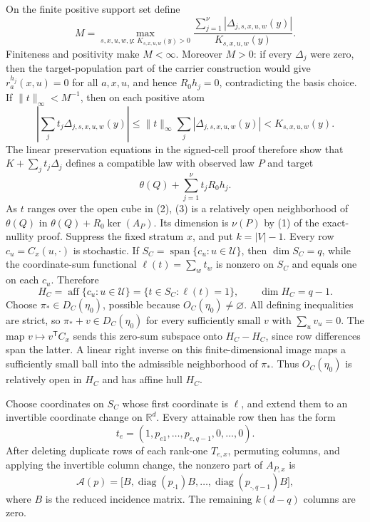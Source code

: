 On the finite positive support set define
\[
M=\max_{s,x,u,w,y:\,K_{s,x,u,w}(y)>0}
\frac{\sum_{j=1}^{\nu}|\Delta_{j,s,x,u,w}(y)|}{K_{s,x,u,w}(y)}.
\tag{1}
\]
Finiteness and positivity make \(M<\infty\).  Moreover \(M>0\): if every \(\Delta_j\) were zero, then the target-population part of the carrier construction would give \(r^{h_j}_a(x,u)=0\) for all \(a,x,u\), and hence \(R_0h_j=0\), contradicting the basis choice.  If \(\lVert t\rVert_\infty<M^{-1}\), then on each positive atom
\[
\left|\sum_jt_j\Delta_{j,s,x,u,w}(y)\right|
\le\lVert t\rVert_\infty\sum_j|\Delta_{j,s,x,u,w}(y)|
<K_{s,x,u,w}(y).
\tag{2}
\]
The linear preservation equations in the signed-cell proof therefore show that \(K+\sum_jt_j\Delta_j\) defines a compatible law with observed law \(P\) and target
\[
\theta(Q)+\sum_{j=1}^{\nu}t_jR_0h_j.
\tag{3}
\]
As \(t\) ranges over the open cube in (2), (3) is a relatively open neighborhood of \(\theta(Q)\) in \(\theta(Q)+R_0\ker(A_P)\).  Its dimension is \(\nu(P)\) by (1) of the exact-nullity proof.
Suppress the fixed stratum \(x\), and put \(k=|V|-1\).  Every row \(c_u=C_x(u,\cdot)\) is stochastic.  If \(S_C=\operatorname{span}\{c_u:u\in\mathcal U\}\), then \(\dim S_C=q\), while the coordinate-sum functional \(\ell(t)=\sum_wt_w\) is nonzero on \(S_C\) and equals one on each \(c_u\).  Therefore
\[
H_C=\operatorname{aff}\{c_u:u\in\mathcal U\}
=\{t\in S_C:\ell(t)=1\},
\qquad \dim H_C=q-1.
\tag{1}
\]
Choose \(\pi_*\in D_C(\eta_0)\), possible because \(O_C(\eta_0)\ne\varnothing\).  All defining inequalities are strict, so \(\pi_*+v\in D_C(\eta_0)\) for every sufficiently small \(v\) with \(\sum_uv_u=0\).  The map \(v\mapsto v^{\mathsf T}C_x\) sends this zero-sum subspace onto \(H_C-H_C\), since row differences span the latter.  A linear right inverse on this finite-dimensional image maps a sufficiently small ball into the admissible neighborhood of \(\pi_*\).  Thus \(O_C(\eta_0)\) is relatively open in \(H_C\) and has affine hull \(H_C\).

Choose coordinates on \(S_C\) whose first coordinate is \(\ell\), and extend them to an invertible coordinate change on \(\mathbb R^d\).  Every attainable row then has the form
\[
t_e=(1,p_{e1},\ldots,p_{e,q-1},0,\ldots,0).
\]
After deleting duplicate rows of each rank-one \(T_{e,x}\), permuting columns, and applying the invertible column change, the nonzero part of \(A_{P,x}\) is
\[
\mathcal A(p)=
\bigl[B,\operatorname{diag}(p_{\cdot1})B,\ldots,
\operatorname{diag}(p_{\cdot,q-1})B\bigr],
\tag{2}
\]
where \(B\) is the reduced incidence matrix.  The remaining \(k(d-q)\) columns are zero.

